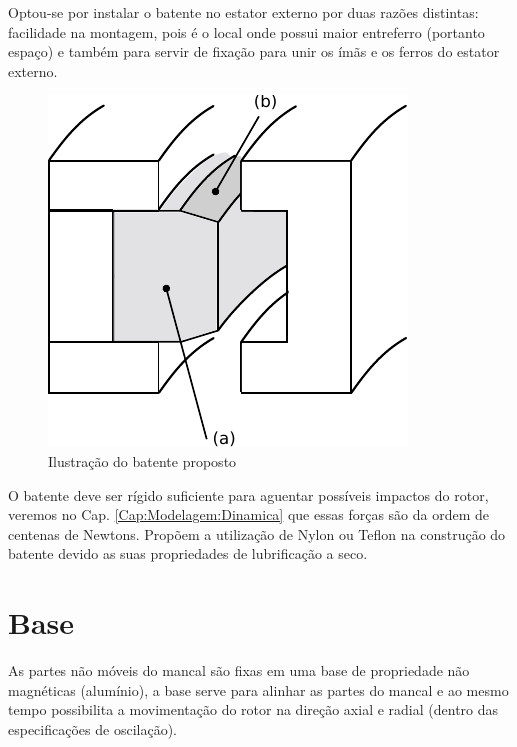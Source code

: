 Optou-se por instalar o batente no estator externo por duas razões distintas: facilidade na montagem, pois  é o local onde possui maior entreferro (portanto espaço) e também para servir de fixação para unir os ímãs e os ferros do estator externo. 

\begin{figure}[th!]
\centering
\includegraphics[width=0.4\linewidth]{./Figs/mancais/mancal_batente_corte}
\caption{Ilustração do batente proposto}
\label{fig:mancal:batente:corte}
\end{figure}



O batente deve ser rígido suficiente para aguentar possíveis impactos do rotor, veremos no Cap. \ref{Cap:Modelagem:Dinamica} que essas forças são da ordem de centenas de Newtons.   Propõem a utilização de Nylon ou Teflon \cite{Johnson2001a} na construção do batente devido as suas propriedades de lubrificação a seco. 

\section{Base}

As partes não móveis do mancal são fixas em uma base de propriedade não magnéticas (alumínio), a base serve para alinhar as partes do mancal e ao mesmo tempo possibilita a movimentação do rotor na direção axial e radial (dentro das especificações de oscilação). 

%

